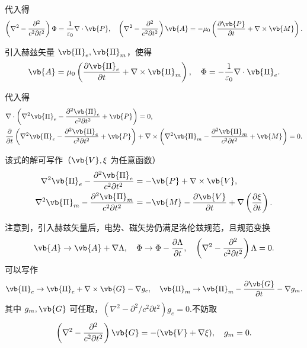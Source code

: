 代入得
\begin{align*}
	\left( \nabla^2 - \frac{\partial^2}{c^2 \partial t^2} \right) \Phi = \frac{1}{\varepsilon_0} \nabla \cdot \vb{P}, \quad \left( \nabla^2 - \frac{\partial^2}{c^2 \partial t^2} \right) \vb{A} = -\mu_0 \left( \frac{\partial \vb{P}}{\partial t} + \nabla \times \vb{M} \right).
\end{align*}

引入赫兹矢量 \(\vb{\Pi}_e, \vb{\Pi}_m\)，使得
\begin{align*}
	\vb{A} = \mu_0 \left( \frac{\partial \vb{\Pi}_e}{\partial t} + \nabla \times \vb{\Pi}_m \right), \quad \Phi = -\frac{1}{\varepsilon_0} \nabla \cdot \vb{\Pi}_e.
\end{align*}

代入得
\begin{align*}
	&\nabla \cdot \left( \nabla^2 \vb{\Pi}_e - \frac{\partial^2 \vb{\Pi}_e}{c^2 \partial t^2} + \vb{P} \right) = 0, \\
	&\frac{\partial}{\partial t} \left( \nabla^2 \vb{\Pi}_e - \frac{\partial^2 \vb{\Pi}_e}{c^2 \partial t^2} + \vb{P} \right) + \nabla \times \left( \nabla^2 \vb{\Pi}_m - \frac{\partial^2 \vb{\Pi}_m}{c^2 \partial t^2} + \vb{M} \right) = 0.
\end{align*}

该式的解可写作（\(\vb{V}, \xi\) 为任意函数）
\begin{align*}
	\nabla^2 \vb{\Pi}_e - \frac{\partial^2 \vb{\Pi}_e}{c^2 \partial t^2} &= -\vb{P} + \nabla \times \vb{V}, \\
	\nabla^2 \vb{\Pi}_m - \frac{\partial^2 \vb{\Pi}_m}{c^2 \partial t^2} &= -\vb{M} - \frac{\partial \vb{V}}{\partial t} + \nabla \left( \frac{\partial \xi}{\partial t} \right).
\end{align*}

注意到，引入赫兹矢量后，电势、磁矢势仍满足洛伦兹规范，且规范变换
\begin{align*}
	\vb{A} \to \vb{A} + \nabla \Lambda, \quad \Phi \to \Phi - \frac{\partial \Lambda}{\partial t}, \quad \left( \nabla^2 - \frac{\partial^2}{c^2 \partial t^2} \right) \Lambda = 0.
\end{align*}
可以写作
\begin{align*}
	\vb{\Pi}_e \to \vb{\Pi}_e + \nabla \times \vb{G} - \nabla g_e, \quad \vb{\Pi}_m \to \vb{\Pi}_m - \frac{\partial \vb{G}}{\partial t} - \nabla g_m.
\end{align*}
其中 \(g_m, \vb{G}\) 可任取，\(\left( \nabla^2 - \partial^2/c^2 \partial t^2 \right) g_e = 0\).不妨取
\begin{align*}
	\left( \nabla^2 - \frac{\partial^2}{c^2 \partial t^2} \right) \vb{G} = -(\vb{V} + \nabla \xi), \quad g_m = 0.
\end{align*}

